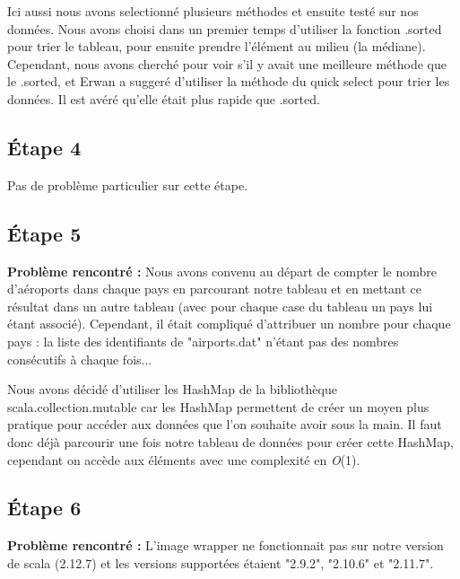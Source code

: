 \documentclass{article}
\begin{document}
 \newline
Ici aussi nous avons selectionné plusieurs méthodes et ensuite testé sur nos données. Nous avons choisi dans un premier temps d'utiliser la fonction .sorted pour trier le tableau, pour ensuite prendre l'élément au milieu (la médiane). Cependant, nous avons cherché pour voir s'il y avait une meilleure méthode que le .sorted, et Erwan a suggeré d'utiliser la méthode du quick select pour trier les données. Il est avéré qu'elle était plus rapide que .sorted.


\subsection{Étape 4} 


Pas de problème particulier sur cette étape.


\subsection{Étape 5}


\textbf{Problème rencontré :} \newline
 Nous avons convenu au départ de compter le nombre d'aéroports dans chaque pays en parcourant notre tableau et en mettant ce résultat dans un autre tableau (avec pour chaque case du tableau un pays lui étant associé). Cependant, il était compliqué d'attribuer un nombre pour chaque pays : la liste des identifiants de "airports.dat" n'étant pas des nombres consécutifs à chaque fois... 
 
\vspace{1\baselineskip}

 \newline
Nous avons décidé d'utiliser les HashMap de la bibliothèque scala.collection.mutable car les HashMap permettent de créer un moyen plus pratique pour accéder aux données que l'on souhaite avoir sous la main. Il faut donc déjà parcourir une fois notre tableau de données pour créer cette HashMap, cependant on accède aux éléments avec une complexité en \textit{O}(1).

\vspace{1\baselineskip}

\subsection{Étape 6} 


\textbf{Problème rencontré :} \newline
L'image wrapper ne fonctionnait pas sur notre version de scala (2.12.7) et les versions supportées étaient "2.9.2", "2.10.6" et "2.11.7".
\end{document}
